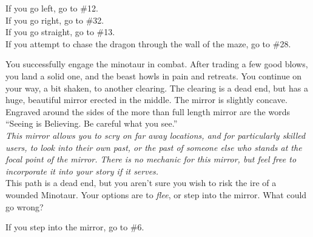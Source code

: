 \documentclass[white]{gl2018}
\begin{document}
\begin{large}
\begin{location}{15}
\begin{fromhere}
   If you go left, go to \#12.\\
 If you go right, go to \#32.\\ 
If you go straight, go to \#13.\\
If you attempt to chase the dragon through the wall of the maze, go to \#28.
\end{fromhere}
\end{location}
\begin{location}{16}
You successfully engage the minotaur in combat. After trading a few good blows, you land a solid one, and the beast howls in pain and retreats. You continue on your way, a bit shaken, to another clearing. The clearing is a dead end, but has a huge, beautiful mirror erected in the middle. The mirror is slightly concave. Engraved around the sides of the more than full length mirror are the words ``Seeing is Believing. Be careful what you see.''\\

\emph{This mirror allows you to scry on far away locations, and for particularly skilled users, to look into their own past, or the past of someone else who stands at the focal point of the mirror. There is no mechanic for this mirror, but feel free to incorporate it into your story if it serves.}\\

This path is a dead end, but you aren't sure you wish to risk the ire of a wounded Minotaur. Your options are to \emph{flee}, or step into the mirror. What could go wrong?

\begin{fromhere}
   If you step into the mirror, go to \#6.\\
\end{fromhere}


\end{location}
\end{large}
\end{document}

